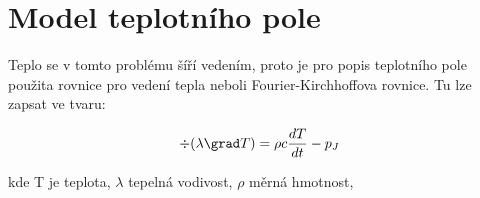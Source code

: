 \section{Model teplotního pole}
Teplo se v tomto problému šíří vedením, proto je pro popis teplotního pole použita rovnice pro vedení tepla neboli Fourier-Kirchhoffova rovnice. Tu lze zapsat ve tvaru:

\begin{equation}
	\div (\lambda \grad T) = \rho c \frac{dT}{dt} - p_J  
\end{equation} \cite{TZEP}

kde T je teplota, $\lambda$ tepelná vodivost, $\rho$ měrná hmotnost, 